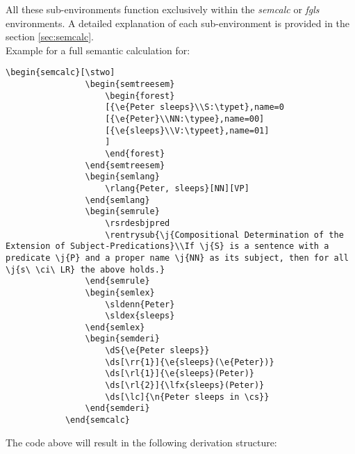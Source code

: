 \documentclass[10pt, a4paper]{article}
\begin{document}
	All these sub-environments function exclusively within the \textit{semcalc} or \textit{fgls} environments. A detailed ex\-pla\-na\-ti\-on of each sub-environment is provided in the section \ref{sec:semcalc}.
	\\Example for a full semantic calculation for: 
	\begin{lstlisting}[style=B]
			\begin{semcalc}[\stwo]
				\begin{semtreesem}
					\begin{forest}
					[{\e{Peter sleeps}\\S:\typet},name=0
					[{\e{Peter}\\NN:\typee},name=00]
					[{\e{sleeps}\\V:\typeet},name=01]
					]
					\end{forest}
				\end{semtreesem}
				\begin{semlang}
					\rlang{Peter, sleeps}[NN][VP]
				\end{semlang}
				\begin{semrule}
					\rsrdesbjpred
					\rentrysub{\j{Compositional Determination of the Extension of Subject-Predications}\\If \j{S} is a sentence with a predicate \j{P} and a proper name \j{NN} as its subject, then for all \j{s\ \ci\ LR} the above holds.}
				\end{semrule}
				\begin{semlex}
					\sldenn{Peter}
					\sldex{sleeps}
				\end{semlex}
				\begin{semderi}
					\dS{\e{Peter sleeps}}
					\ds[\rr{1}]{\e{sleeps}(\e{Peter})}
					\ds[\rl{1}]{\e{sleeps}(Peter)}
					\ds[\rl{2}]{\lfx{sleeps}(Peter)}
					\ds[\lc]{\n{Peter sleeps in \cs}}
				\end{semderi}
			\end{semcalc}
	\end{lstlisting}
	The code above will result in the following derivation structure:
\end{document}
